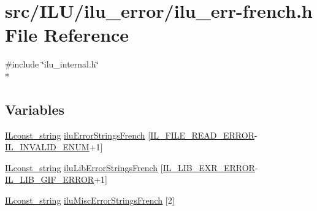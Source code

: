 \hypertarget{ilu__err-french_8h}{\section{src/\-I\-L\-U/ilu\-\_\-error/ilu\-\_\-err-\/french.h File Reference}
\label{ilu__err-french_8h}
}
{\ttfamily \#include \char`\"{}ilu\-\_\-internal.\-h\char`\"{}}\\*
\subsection*{Variables}
\begin{DoxyCompactItemize}
\item 
\hyperlink{il_8h_a103ef32cc870d648d471aff6c7076747}{I\-Lconst\-\_\-string} \hyperlink{ilu__err-french_8h_a85c603a6aba6dadfd12cf4ba62e1443e}{ilu\-Error\-Strings\-French} \mbox{[}\hyperlink{il_8h_ae70fdd3b6e8434371177ed2547b75841}{I\-L\-\_\-\-F\-I\-L\-E\-\_\-\-R\-E\-A\-D\-\_\-\-E\-R\-R\-O\-R}-\/\hyperlink{il_8h_adf311fb99b5d12d7ef3795b0ab3dd918}{I\-L\-\_\-\-I\-N\-V\-A\-L\-I\-D\-\_\-\-E\-N\-U\-M}+1\mbox{]}
\item 
\hyperlink{il_8h_a103ef32cc870d648d471aff6c7076747}{I\-Lconst\-\_\-string} \hyperlink{ilu__err-french_8h_ae7416d6115ade23414a0e710043f6a4e}{ilu\-Lib\-Error\-Strings\-French} \mbox{[}\hyperlink{il_8h_a4792903188701caaeaa625e49af84a66}{I\-L\-\_\-\-L\-I\-B\-\_\-\-E\-X\-R\-\_\-\-E\-R\-R\-O\-R}-\/\hyperlink{il_8h_ab2d4eb290bfe9e2e5c8d590213034e50}{I\-L\-\_\-\-L\-I\-B\-\_\-\-G\-I\-F\-\_\-\-E\-R\-R\-O\-R}+1\mbox{]}
\item 
\hyperlink{il_8h_a103ef32cc870d648d471aff6c7076747}{I\-Lconst\-\_\-string} \hyperlink{ilu__err-french_8h_acd78ccbbdd8688cae089f39df33ad365}{ilu\-Misc\-Error\-Strings\-French} \mbox{[}2\mbox{]}
\end{DoxyCompactItemize}


